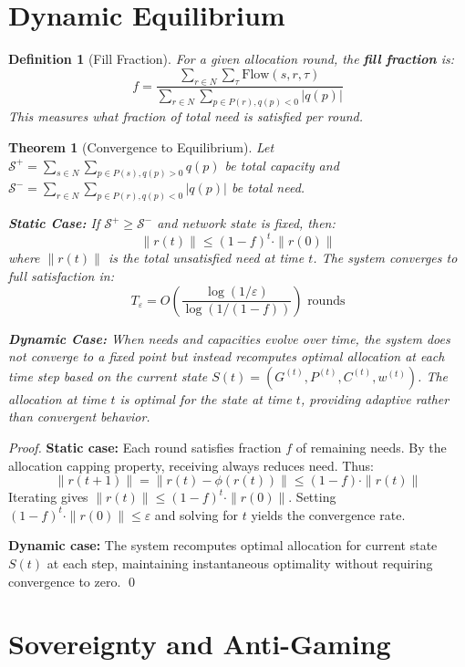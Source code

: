 \documentclass[11pt]{article}
\newtheorem{definition}{Definition}
\newtheorem{theorem}{Theorem}
\begin{document}
\section{Dynamic Equilibrium}

\begin{definition}[Fill Fraction]
For a given allocation round, the \textbf{fill fraction} is:
\[
f = \frac{\sum_{r \in N} \sum_{\tau} \text{Flow}(s, r, \tau)}{\sum_{r \in N} \sum_{p \in P(r), q(p) < 0} |q(p)|}
\]
This measures what fraction of total need is satisfied per round.
\end{definition}

\begin{theorem}[Convergence to Equilibrium]
Let $\mathcal{S}^+ = \sum_{s \in N} \sum_{p \in P(s), q(p) > 0} q(p)$ be total capacity and $\mathcal{S}^- = \sum_{r \in N} \sum_{p \in P(r), q(p) < 0} |q(p)|$ be total need.

\textbf{Static Case:} If $\mathcal{S}^+ \geq \mathcal{S}^-$ and network state is fixed, then:
\[
\|r(t)\| \leq (1-f)^t \cdot \|r(0)\|
\]
where $\|r(t)\|$ is the total unsatisfied need at time $t$. The system converges to full satisfaction in:
\[
T_\varepsilon = O\left(\frac{\log(1/\varepsilon)}{\log(1/(1-f))}\right) \text{ rounds}
\]

\textbf{Dynamic Case:} When needs and capacities evolve over time, the system does not converge to a fixed point but instead recomputes optimal allocation at each time step based on the current state $S(t) = (G^{(t)}, P^{(t)}, C^{(t)}, w^{(t)})$. The allocation at time $t$ is optimal for the state at time $t$, providing adaptive rather than convergent behavior.
\end{theorem}

\begin{proof}
\textbf{Static case:} Each round satisfies fraction $f$ of remaining needs. By the allocation capping property, receiving always reduces need. Thus:
\[
\|r(t+1)\| = \|r(t) - \phi(r(t))\| \leq (1-f) \cdot \|r(t)\|
\]
Iterating gives $\|r(t)\| \leq (1-f)^t \cdot \|r(0)\|$. Setting $(1-f)^t \cdot \|r(0)\| \leq \varepsilon$ and solving for $t$ yields the convergence rate.

\textbf{Dynamic case:} The system recomputes optimal allocation for current state $S(t)$ at each step, maintaining instantaneous optimality without requiring convergence to zero. \qed
\end{proof}

\section{Sovereignty and Anti-Gaming}
\end{document}
